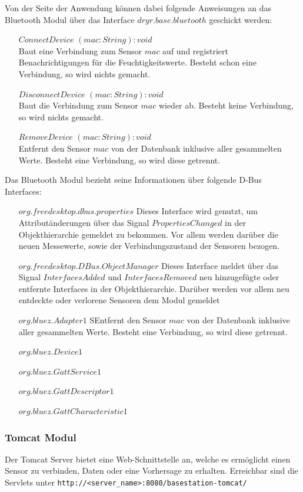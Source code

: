 Von der Seite der Anwendung können dabei folgende Anweisungen an das Bluetooth Modul über das Interface $dryr.base.bluetooth$ geschickt werden:
\begin{enumerate}
	\item[$ConnectDevice$] $(mac: String) : void$ \\
		Baut eine Verbindung zum Sensor $mac$ auf und registriert Benachrichtigungen für die Feuchtigkeitswerte. Besteht schon eine Verbindung, so wird nichts gemacht.
	\item[$DisconnectDevice$] $(mac: String) : void$ \\
		Baut die Verbindung zum Sensor $mac$ wieder ab. Besteht keine Verbindung, so wird nichts gemacht.
	\item[$RemoveDevice$] $(mac: String) : void$ \\
		Entfernt den Sensor $mac$ von der Datenbank inklusive aller gesammelten Werte. Besteht eine Verbindung, so wird diese getrennt.
\end{enumerate}

Das Bluetooth Modul bezieht seine Informationen über folgende D-Bus Interfaces:
\begin{enumerate}
	\item[$org.freedesktop.dbus.properties$]
		Dieses Interface wird genutzt, um Attributänderungen über das Signal $PropertiesChanged$ in der Objekthierarchie gemeldet zu bekommen. Vor allem werden darüber die neuen Messewerte, sowie der Verbindungszustand der Sensoren bezogen.
	\item[$org.freedesktop.DBus.ObjectManager$]
		Dieses Interface meldet über das Signal $InterfacesAdded$ und $InterfacesRemoved$ neu hinzugefügte oder entfernte Interfaces in der Objekthierarchie. Darüber werden vor allem neu entdeckte oder verlorene Sensoren dem Modul gemeldet
	\item[$org.bluez.Adapter1$]
		SEntfernt den Sensor $mac$ von der Datenbank inklusive aller gesammelten Werte. Besteht eine Verbindung, so wird diese getrennt.
	\item[$org.bluez.Device1$]
	\item[$org.bluez.GattService1$]
	\item[$org.bluez.GattDescriptor1$]
	\item[$org.bluez.GattCharacteristic1$]
\end{enumerate}

\subsubsection{Tomcat Modul}
Der Tomcat Server bietet eine Web-Schnittstelle an, welche es ermöglicht einen Sensor zu verbinden, Daten oder eine Vorhersage zu erhalten.
Erreichbar sind die Servlets unter \texttt{http://<server\_name>:8080/basestation-tomcat/}
	
